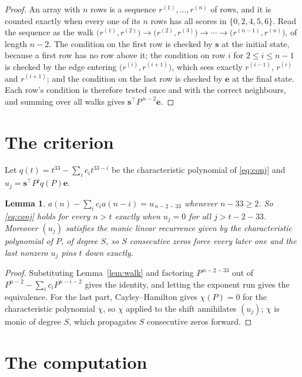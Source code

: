 \documentclass[11pt,a4paper]{article}
\theoremstyle{plain}
\newtheorem{lemma}[theorem]{Lemma}
\theoremstyle{definition}
\begin{document}
\begin{proof}
An array with $n$ rows is a sequence $r^{(1)},\dots,r^{(n)}$ of rows, and it is counted
exactly when every one of its $n$ rows has all scores in $\{0,2,4,5,6\}$. Read the sequence as the
walk $\bigl(r^{(1)},r^{(2)}\bigr)\to\bigl(r^{(2)},r^{(3)}\bigr)\to\cdots\to
\bigl(r^{(n-1)},r^{(n)}\bigr)$, of length $n-2$. The condition on the first row is
checked by $\mathbf{s}$ at the initial state, because a first row has no row above it; the
condition on row $i$ for $2\le i\le n-1$ is checked by the edge entering
$\bigl(r^{(i)},r^{(i+1)}\bigr)$, which sees exactly $r^{(i-1)}$, $r^{(i)}$ and
$r^{(i+1)}$; and the condition on the last row is checked by $\mathbf{e}$ at the final
state. Each row's condition is therefore tested once and with the correct neighbours, and
summing over all walks gives $\mathbf{s}^{\!\top}P^{\,n-2}\mathbf{e}$.
\end{proof}

\section{The criterion}

Let $q(t)=t^{33}-\sum_i c_i t^{33-i}$ be the characteristic polynomial of
\eqref{eq:conj} and $u_j=\mathbf{s}^{\!\top}P^{j}q(P)\mathbf{e}$.

\begin{lemma}\label{lem:crit}
$a(n)-\sum_i c_i a(n-i)=u_{\,n-2-33}$ whenever $n-33\ge2$. So \eqref{eq:conj}
holds for every $n>t$ exactly when $u_j=0$ for all $j>t-2-33$. Moreover $(u_j)$
satisfies the monic linear recurrence given by the characteristic polynomial of $P$, of
degree $S$, so $S$ consecutive zeros force every later one and the last nonzero $u_j$ pins
$t$ down exactly.
\end{lemma}

\begin{proof}
Substituting Lemma~\ref{lem:walk} and factoring $P^{\,n-2-33}$ out of
$P^{n-2}-\sum_i c_i P^{n-i-2}$ gives the identity, and letting the exponent run gives the
equivalence. For the last part, Cayley--Hamilton gives $\chi(P)=0$ for the characteristic
polynomial $\chi$, so $\chi$ applied to the shift annihilates $(u_j)$; $\chi$ is monic of
degree $S$, which propagates $S$ consecutive zeros forward.
\end{proof}

\section{The computation}
\end{document}
